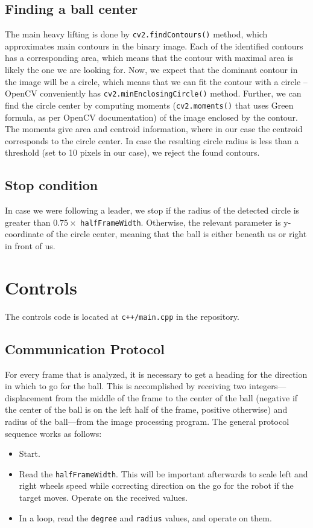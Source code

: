 \documentclass[12pt, twoside, a4paper, titlepage]{article}
\begin{document}
\subsection{Finding a ball center}
The main heavy lifting is done by \texttt{cv2.findContours()} method, which approximates main contours in the binary image. Each of the identified contours has a corresponding area, which means that the contour with maximal area is likely the one we are looking for. Now, we expect that the dominant contour in the image will be a circle, which means that we can fit the contour with a circle -- OpenCV conveniently has \texttt{cv2.minEnclosingCircle()} method. Further, we can find the circle center by computing moments (\texttt{cv2.moments()} that uses Green formula, as per OpenCV documentation) of the image enclosed by the contour. The moments give area and centroid information, where in our case the centroid corresponds to the circle center. In case the resulting circle radius is less than a threshold (set to 10 pixels in our case), we reject the found contours.

\subsection{Stop condition}
In case we were following a leader, we stop if the radius of the detected circle is greater than $0.75 \times $ \texttt{halfFrameWidth}. Otherwise, the relevant parameter is y-coordinate of the circle center, meaning that the ball is either beneath us or right in front of us. 

\section{Controls}
The controls code is located at \texttt{c++/main.cpp} in the repository.
\subsection{Communication Protocol}
For every frame that is analyzed, it is necessary to get a heading for the direction in which to go for the ball. This is accomplished by receiving two integers---displacement from the middle of the frame to the center of the ball (negative if the center of the ball is on the left half of the frame, positive otherwise) and radius of the ball---from the image processing program. The general protocol sequence works as follows:
\begin{itemize}
\item Start.
\item Read the \texttt{halfFrameWidth}. This will be important afterwards to scale left and right wheels speed while correcting direction on the go for the robot if the target moves. Operate on the received values.
\item In a loop, read the \texttt{degree} and \texttt{radius} values, and operate on them.
\end{itemize}
\end{document}
